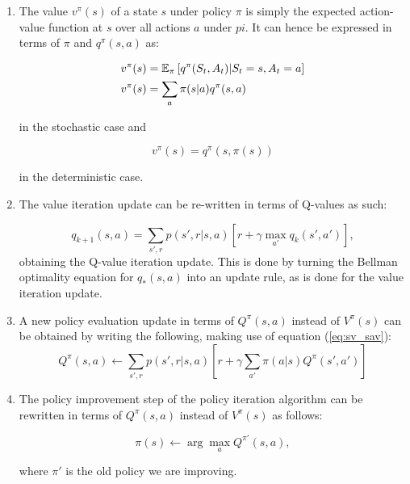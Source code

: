 \documentclass[
]{article}
\begin{document}
\begin{enumerate}
\def\labelenumi{\arabic{enumi}.}
\item
  The value \(v^\pi(s)\) of a state \(s\) under policy \(\pi\) is simply
  the expected action-value function at \(s\) over all actions \(a\)
  under \(pi\). It can hence be expressed in terms of \(\pi\) and
  \(q^\pi(s, a)\) as:

  \begin{align}
     v^\pi(s) &= \mathbb{E}_\pi\left[q^\pi(S_t, A_t) | S_t = s, A_t=a\right]\notag\\ 
     v^\pi(s) &= \sum_a \pi(s|a) q^\pi(s, a) \label{eq:sv_sav}
  \end{align}

  in the stochastic case and

  \begin{equation}
     v^\pi(s) =  q^\pi(s, \pi(s))
  \end{equation}

  in the deterministic case.

\item
  The value iteration update can be re-written in terms of Q-values as such:
  
  \begin{equation}
    q_{k+1}(s, a) = \sum_{s', r} p(s', r | s, a)\left[r + \gamma \max_{a'} q_k(s', a')\right],
  \end{equation}
  obtaining the Q-value iteration update. This is done by turning the Bellman optimality equation
  for $q_*(s, a)$ into an update rule, as is done for the value iteration update.

\item
  A new policy evaluation update in terms of $Q^\pi(s, a)$ instead of $V^\pi(s)$ can be obtained by
  writing the following, making use of equation (\ref{eq:sv_sav}):
  \begin{equation}
    Q^\pi(s, a) \leftarrow \sum_{s', r} p(s', r| s, a)\left[r + \gamma \sum_{a'}\pi(a|s)Q^\pi(s', a')\right]
  \end{equation}
\item

  The policy improvement step of the policy iteration algorithm can be rewritten in terms of
  $Q^\pi(s, a)$ instead of $V^\pi(s)$ as follows:

  \begin{equation}
    \pi(s) \leftarrow \arg\max_a Q^{\pi'}(s, a),
  \end{equation}

  where $\pi'$ is the old policy we are improving.
  

\end{enumerate}
\end{document}
